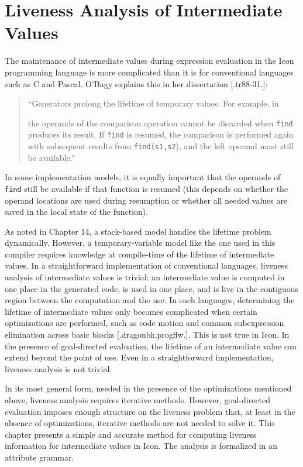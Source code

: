 \chapter{Liveness Analysis of Intermediate Values}

The maintenance of intermediate values during expression evaluation in
the Icon programming language is more complicated than it is for
conventional languages such as C and Pascal. O'Bagy explains this in
her dissertation [.tr88-31.]:

\begin{quote}
``Generators prolong the lifetime of temporary values. For example, in 


\noindent
the operands of the comparison operation cannot be discarded when
\texttt{find} produces its result. If \texttt{find} is resumed, the
comparison is performed again with subsequent results from
\texttt{find(s1,s2}), and the left operand must still be available.''
\end{quote}

\noindent In some implementation models, it is equally important that
the operands of \texttt{find} still be available if that function is
resumed (this depends on whether the operand locations are used during
resumption or whether all needed values are saved in the local state
of the function).

As noted in Chapter 14, a stack-based model handles the lifetime
problem dynamically. However, a temporary-variable model like the one
used in this compiler requires knowledge at compile-time of the
lifetime of intermediate values. In a straightforward implementation
of conventional languages, liveness analysis of intermediate values is
trivial: an intermediate value is computed in one place in the
generated code, is used in one place, and is live in the contiguous
region between the computation and the use. In such languages,
determining the lifetime of intermediate values only becomes
complicated when certain optimizations are performed, such as code
motion and common subexpression elimination across basic blocks
[.dragonbk,progflw.]. This is not true in Icon. In the presence of
goal-directed evaluation, the lifetime of an intermediate value can
extend beyond the point of use. Even in a straightforward
implementation, liveness analysis is not trivial.

In its most general form, needed in the presence of the optimizations
mentioned above, liveness analysis requires iterative
methods. However, goal-directed evaluation imposes enough structure on
the liveness problem that, at least in the absence of optimizations,
iterative methods are not needed to solve it. This chapter presents a
simple and accurate method for computing liveness information for
intermediate values in Icon. The analysis is formalized in an
attribute grammar.



